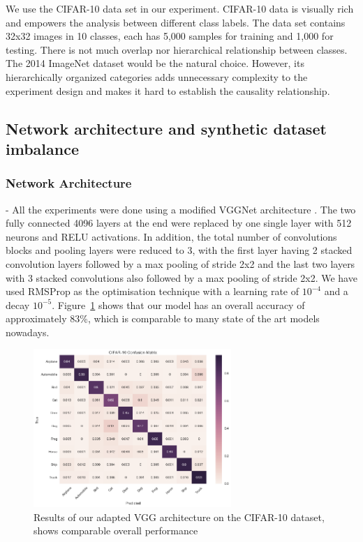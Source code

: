 \documentclass[runningheads,a4paper]{llncs}
\begin{document}
We use the CIFAR-10 data set \cite{krizhevsky_2009} in our experiment. CIFAR-10 data is visually rich and empowers the analysis between different class labels. The data set contains 32x32 images in 10 classes, each has 5,000 samples for training and 1,000 for testing. There is not much overlap nor hierarchical relationship between classes. The 2014 ImageNet dataset \cite{deng2009imagenet} would be the natural choice. However, its hierarchically organized categories adds unnecessary complexity to the experiment design and makes it hard to establish the causality relationship.
\subsection{Network architecture and synthetic dataset imbalance}

\subsubsection{Network Architecture} - All the experiments were done using a modified VGGNet architecture \cite{simonyan2014very}. The two fully connected 4096 layers at the end were replaced by one single layer with 512 neurons and RELU activations. In addition, the total number of convolutions blocks and pooling layers were reduced to 3, with the first layer having 2 stacked convolution layers followed by a max pooling of stride 2x2 and the last two layers with 3 stacked convolutions also followed by a max pooling of stride 2x2. We have used RMSProp  \cite{bengiormsprop} as the optimisation technique with a learning rate of $10^{-4}$ and a decay $10^{-5}$. Figure~\ref{fig:conf_matrix_full} shows that our model has an overall accuracy of approximately 83\%, which is comparable to many state of the art models nowadays.

\begin{figure}
	\centering
	\includegraphics[height=6.0cm]{conf_matrix.png}
	\caption{Results of our adapted VGG architecture on the CIFAR-10 dataset, shows comparable overall performance}
	\label{fig:conf_matrix_full}
\end{figure}
\end{document}
